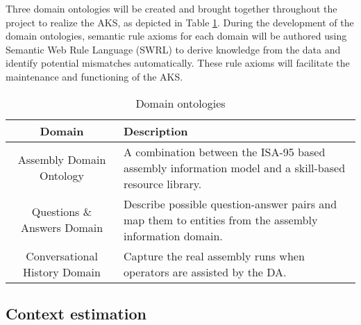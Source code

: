 Three domain ontologies will be created and brought together throughout the project to realize the AKS, as depicted in Table \ref{tab:ontolgoies}. During the development of the domain ontologies, semantic rule axioms \cite{sormaz2019SIMPMUpperlevelOntology} for each domain will be authored using Semantic Web Rule Language (SWRL) to derive knowledge from the data and identify potential mismatches automatically. These rule axioms will facilitate the maintenance and functioning of the AKS.

\begin{table}
  \caption{Domain ontologies}
  \label{tab:ontolgoies}
  \begin{tabular}{cp{7cm}}
    \toprule
    Domain & Description\\
    \midrule
    Assembly Domain Ontology &  A combination between the ISA-95 based assembly information model \cite{claeys2018OntologicalModelManaging} and a skill-based resource library.\\ 
    Questions \& Answers Domain & Describe possible question-answer pairs and map them to entities from the assembly information domain. \\
    Conversational History Domain & Capture the real assembly runs when operators are assisted by the DA.\\
    \bottomrule
  \end{tabular}
\end{table}


\subsection{Context estimation}

